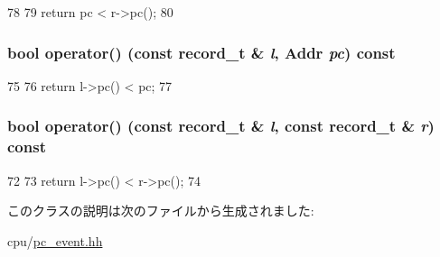 \begin{DoxyCode}
78                                                           {
79             return pc < r->pc();
80         }
\end{DoxyCode}
\hypertarget{classPCEventQueue_1_1MapCompare_a631c2cc07abd3f3ad605ef899b76d9c4}{
\subsubsection[{operator()}]{\setlength{\rightskip}{0pt plus 5cm}bool operator() (const {\bf record\_\-t} \& {\em l}, \/  {\bf Addr} {\em pc}) const}}
\label{classPCEventQueue_1_1MapCompare_a631c2cc07abd3f3ad605ef899b76d9c4}



\begin{DoxyCode}
75                                                           {
76             return l->pc() < pc;
77         }
\end{DoxyCode}
\hypertarget{classPCEventQueue_1_1MapCompare_a26358b61edb47a8028684f18bfd18428}{
\subsubsection[{operator()}]{\setlength{\rightskip}{0pt plus 5cm}bool operator() (const {\bf record\_\-t} \& {\em l}, \/  const {\bf record\_\-t} \& {\em r}) const}}
\label{classPCEventQueue_1_1MapCompare_a26358b61edb47a8028684f18bfd18428}



\begin{DoxyCode}
72                                                                     {
73             return l->pc() < r->pc();
74         }
\end{DoxyCode}


このクラスの説明は次のファイルから生成されました:\begin{DoxyCompactItemize}
\item 
cpu/\hyperlink{pc__event_8hh}{pc\_\-event.hh}\end{DoxyCompactItemize}
